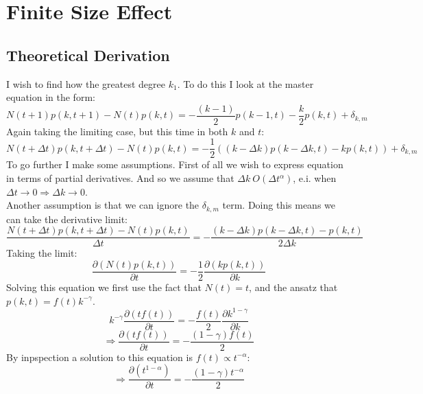 \documentclass[]{article}
\begin{document}
\section{Finite Size Effect}
\subsection{Theoretical Derivation}
I wish to find how the greatest degree $k_1$. To do this I look at the master equation in the form:
\begin{equation}
N(t+1)p(k,t+1)-N(t)p(k,t)=-\frac{(k-1)}{2}p(k-1,t)-\frac{k}{2}p(k,t)+ \delta_{k,m}	
\end{equation}
Again taking the limiting case, but this time in both $k$ and $t$:
\begin{equation}
N(t+\Delta t)p(k,t+\Delta t)-N(t)p(k,t)=-\frac{1}{2}((k-\Delta k)p(k-\Delta k,t)-kp(k,t))+ \delta_{k,m}		
\end{equation}
To go further I make some assumptions. First of all we wish to express equation in terms of partial derivatives. And so we assume that $\Delta k ~ O(\Delta t^{\alpha})$, e.i. when $\Delta t \rightarrow 0 \Rightarrow \Delta k \rightarrow 0$. \\
Another assumption is that we can ignore the  $\delta_{k,m}$ term. Doing this means we can take the derivative limit:
\begin{equation}
	\frac{N(t+\Delta t)p(k,t+\Delta t)-N(t)p(k,t)}{\Delta t}=-\frac{(k-\Delta k)p(k-\Delta k,t)-p(k,t)}{2 \Delta k}
\end{equation}
Taking the limit:
\begin{equation}
\frac{\partial (N(t)p(k,t))}{\partial t}= -\frac{1}{2}\frac{\partial(kp(k,t))}{\partial k}
\end{equation}
Solving this equation we first use the fact that $N(t)=t$, and  the ansatz that $p(k,t)=f(t)k^{-\gamma}$.
\begin{equation} 
k^{-\gamma}\frac{\partial (tf(t))}{\partial t}= -\frac{f(t)}{2}\frac{\partial k^{1-\gamma}}{\partial k}
\end{equation}
\begin{equation}
	\Rightarrow \frac{\partial (tf(t))}{\partial t}= -\frac{(1-\gamma)f(t)}{2}
\end{equation}
By inpspection a solution to this equation is $f(t) \propto t^{-\alpha}$:
\begin{equation}
\Rightarrow  \frac{\partial (t^{1-\alpha})}{\partial t}= -\frac{(1-\gamma)t^{-\alpha}}{2}
\end{equation}
\end{document}

